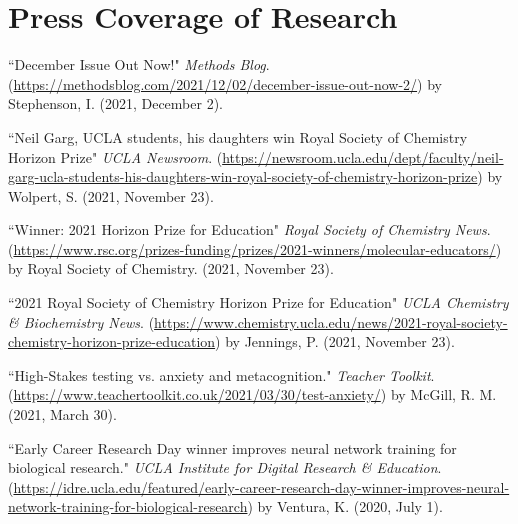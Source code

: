 \section*{Press Coverage of Research}
``December Issue Out Now!" \textit{Methods Blog}. (\textcolor{RoyalBlue}{\href{https://methodsblog.com/2021/12/02/december-issue-out-now-2/}{https://methodsblog.com/2021/12/02/december-issue-out-now-2/}}) by Stephenson, I. (2021, December 2).

\pubspace

``Neil Garg, UCLA students, his daughters win Royal Society of Chemistry Horizon Prize" \textit{UCLA Newsroom}. (\textcolor{RoyalBlue}{\href{https://newsroom.ucla.edu/dept/faculty/neil-garg-ucla-students-his-daughters-win-royal-society-of-chemistry-horizon-prize}{https://newsroom.ucla.edu/dept/faculty/neil-garg-ucla-students-his-daughters-win-royal-society-of-chemistry-horizon-prize}}) by Wolpert, S. (2021, November 23).

\pubspace

``Winner: 2021 Horizon Prize for Education" \textit{Royal Society of Chemistry News}. (\textcolor{RoyalBlue}{\href{https://www.rsc.org/prizes-funding/prizes/2021-winners/molecular-educators/}{https://www.rsc.org/prizes-funding/prizes/2021-winners/molecular-educators/}}) by Royal Society of Chemistry. (2021, November 23).

\pubspace

``2021 Royal Society of Chemistry Horizon Prize for Education" \textit{UCLA Chemistry \& Biochemistry News}. (\textcolor{RoyalBlue}{\href{https://www.chemistry.ucla.edu/news/2021-royal-society-chemistry-horizon-prize-education}{https://www.chemistry.ucla.edu/news/2021-royal-society-chemistry-horizon-prize-education}}) by Jennings, P. (2021, November 23).

\pubspace

``High-Stakes testing vs. anxiety and metacognition." \textit{Teacher Toolkit}. \\ (\textcolor{RoyalBlue}{\href{https://www.teachertoolkit.co.uk/2021/03/30/test-anxiety/}{https://www.teachertoolkit.co.uk/2021/03/30/test-anxiety/}}) by McGill, R. M. (2021, March 30).

\pubspace

``Early Career Research Day winner improves neural network training for biological research." \textit{UCLA Institute for Digital Research \& Education}. (\textcolor{RoyalBlue}{\href{https://idre.ucla.edu/featured/early-career-research-day-winner-improves-neural-network-training-for-biological-research}{https://idre.ucla.edu/featured/early-career-research-day-winner-improves-neural-network-training-for-biological-research}}) by Ventura, K. (2020, July 1).

